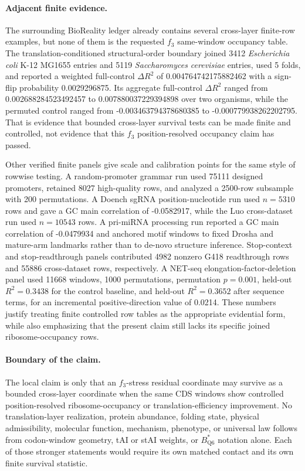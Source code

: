 \paragraph{Adjacent finite evidence.}
The surrounding BioReality ledger already contains several cross-layer finite-row examples, but none of them is the requested $f_3$ same-window occupancy table.  The translation-conditioned structural-order boundary joined 3412 \emph{Escherichia coli} K-12 MG1655 entries and 5119 \emph{Saccharomyces cerevisiae} entries, used 5 folds, and reported a weighted full-control $\Delta R^2$ of 0.004764742175882462 with a sign-flip probability 0.0029296875.  Its aggregate full-control $\Delta R^2$ ranged from 0.002688284523492457 to 0.007880037229394898 over two organisms, while the permuted control ranged from -0.003463794378680385 to -0.000779938262202795.  That is evidence that bounded cross-layer survival tests can be made finite and controlled, not evidence that this $f_3$ position-resolved occupancy claim has passed.

Other verified finite panels give scale and calibration points for the same style of rowwise testing.  A random-promoter grammar run used 75111 designed promoters, retained 8027 high-quality rows, and analyzed a 2500-row subsample with 200 permutations.  A Doench sgRNA position-nucleotide run used $n=5310$ rows and gave a GC main correlation of -0.0582917, while the Luo cross-dataset run used $n=10543$ rows.  A pri-miRNA processing run reported a GC main correlation of -0.0479934 and anchored motif windows to fixed Drosha and mature-arm landmarks rather than to de-novo structure inference.  Stop-context and stop-readthrough panels contributed 4982 nonzero G418 readthrough rows and 55886 cross-dataset rows, respectively.  A NET-seq elongation-factor-deletion panel used 11668 windows, 1000 permutations, permutation $p=0.001$, held-out $R^2=0.3438$ for the control baseline, and held-out $R^2=0.3652$ after sequence terms, for an incremental positive-direction value of 0.0214.  These numbers justify treating finite controlled row tables as the appropriate evidential form, while also emphasizing that the present claim still lacks its specific joined ribosome-occupancy rows.

\paragraph{Boundary of the claim.}
The local claim is only that an $f_3$-stress residual coordinate may survive as a bounded cross-layer coordinate when the same CDS windows show controlled position-resolved ribosome-occupancy or translation-efficiency improvement.  No translation-layer realization, protein abundance, folding state, physical admissibility, molecular function, mechanism, phenotype, or universal law follows from codon-window geometry, tAI or stAI weights, or $B^*_\mathrm{Q6}$ notation alone.  Each of those stronger statements would require its own matched contact and its own finite survival statistic.

